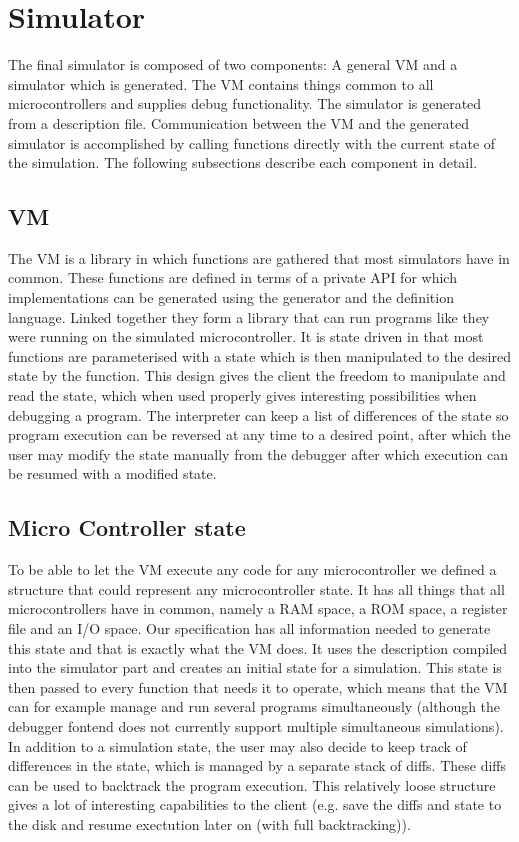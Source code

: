 \chapter{Simulator}
The final simulator is composed of two components: A general VM and a
simulator which is generated. The VM contains things common to all 
microcontrollers and supplies debug functionality. The simulator is generated from a description file. Communication between the VM and the generated simulator is accomplished 
by calling functions directly with the current state of the simulation. The following
subsections describe each component in detail.

\section{VM}

The VM is a library in which functions are gathered that most simulators
have in common. These functions are defined in terms of a private API
for which implementations can be generated using the generator and the
definition language. Linked together they form a library that can run
programs like they were running on the simulated microcontroller. It
is state driven in that most functions are parameterised with a state
which is then manipulated to the desired state by the function. This
design gives the client the freedom to manipulate and read the
state, which when used properly gives interesting possibilities when
debugging a program. The interpreter can keep a list of differences of the
state so program execution can be reversed at any time to a desired point,
after which the user may modify the state manually from the debugger after
which execution can be resumed with a modified state.

\section{Micro Controller state}
To be able to let the VM execute any code for any microcontroller we
defined a structure that could represent any microcontroller state. It
has all things that all microcontrollers have in common, namely a RAM space, a
ROM space, a register file and an I/O space.
Our specification has all information needed
to generate this state and that is exactly what the VM does. It uses the
description compiled into the simulator part and creates an initial state for 
a simulation. This state is
then passed to every function that needs it to operate, which means that the 
VM can for example manage and run several programs simultaneously (although
the debugger fontend does not currently support multiple simultaneous
simulations). \\
In addition to a simulation state, the user may also decide to keep track of
differences in the state, which is managed by a separate stack of diffs.
These diffs can be used to backtrack the program execution. This relatively loose structure gives
a lot of interesting capabilities to the client (e.g. save the diffs
and state to the disk and resume exectution later on (with
full backtracking)).

